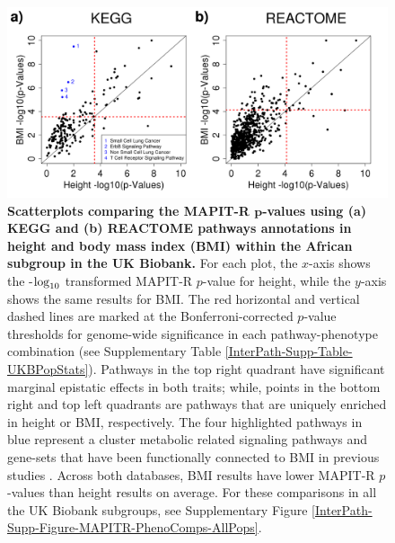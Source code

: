 \documentclass[10pt]{article}
\def\log{{\rm log}}
\begin{document}
\begin{figure}[htb]
\centering
\includegraphics[width=\textwidth]{Images/Main/InterPath_Main_Figure_MAPITR_PhenoComps_African_vs4_legend.png}
\caption{\textbf{Scatterplots comparing the MAPIT-R $\bm{p}$-values using (a) KEGG and (b) REACTOME pathways annotations in height and body mass index (BMI) within the African subgroup in the UK Biobank.} For each plot, the $x$-axis shows the -$\log_{10}$ transformed MAPIT-R $p$-value for height, while the $y$-axis shows the same results for BMI. The red horizontal and vertical dashed lines are marked at the Bonferroni-corrected $p$-value thresholds for genome-wide significance in each pathway-phenotype combination (see Supplementary Table \ref{InterPath-Supp-Table-UKBPopStats}). Pathways in the top right quadrant have significant marginal epistatic effects in both traits; while, points in the bottom right and top left quadrants are pathways that are uniquely enriched in height or BMI, respectively. The four highlighted pathways in blue represent a cluster metabolic related signaling pathways and gene-sets that have been functionally connected to BMI in previous studies \cite{George2004,Manning2017,Latva-Rasku2018}. Across both databases, BMI results have lower MAPIT-R $p$-values than height results on average. For these comparisons in all the UK Biobank subgroups, see Supplementary Figure \ref{InterPath-Supp-Figure-MAPITR-PhenoComps-AllPops}.}
\label{InterPath-Main-Figure-MAPITR-PhenoComps-African}
\end{figure}

\end{document}
